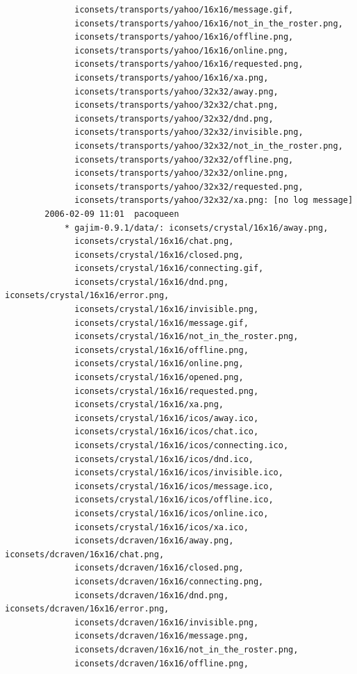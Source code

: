 \documentclass[a4paper]{article}
\begin{document}
\begin{verbatim}
              iconsets/transports/yahoo/16x16/message.gif,
              iconsets/transports/yahoo/16x16/not_in_the_roster.png,
              iconsets/transports/yahoo/16x16/offline.png,
              iconsets/transports/yahoo/16x16/online.png,
              iconsets/transports/yahoo/16x16/requested.png,
              iconsets/transports/yahoo/16x16/xa.png,
              iconsets/transports/yahoo/32x32/away.png,
              iconsets/transports/yahoo/32x32/chat.png,
              iconsets/transports/yahoo/32x32/dnd.png,
              iconsets/transports/yahoo/32x32/invisible.png,
              iconsets/transports/yahoo/32x32/not_in_the_roster.png,
              iconsets/transports/yahoo/32x32/offline.png,
              iconsets/transports/yahoo/32x32/online.png,
              iconsets/transports/yahoo/32x32/requested.png,
              iconsets/transports/yahoo/32x32/xa.png: [no log message]
        2006-02-09 11:01  pacoqueen
            * gajim-0.9.1/data/: iconsets/crystal/16x16/away.png,
              iconsets/crystal/16x16/chat.png,
              iconsets/crystal/16x16/closed.png,
              iconsets/crystal/16x16/connecting.gif,
              iconsets/crystal/16x16/dnd.png, iconsets/crystal/16x16/error.png,
              iconsets/crystal/16x16/invisible.png,
              iconsets/crystal/16x16/message.gif,
              iconsets/crystal/16x16/not_in_the_roster.png,
              iconsets/crystal/16x16/offline.png,
              iconsets/crystal/16x16/online.png,
              iconsets/crystal/16x16/opened.png,
              iconsets/crystal/16x16/requested.png,
              iconsets/crystal/16x16/xa.png,
              iconsets/crystal/16x16/icos/away.ico,
              iconsets/crystal/16x16/icos/chat.ico,
              iconsets/crystal/16x16/icos/connecting.ico,
              iconsets/crystal/16x16/icos/dnd.ico,
              iconsets/crystal/16x16/icos/invisible.ico,
              iconsets/crystal/16x16/icos/message.ico,
              iconsets/crystal/16x16/icos/offline.ico,
              iconsets/crystal/16x16/icos/online.ico,
              iconsets/crystal/16x16/icos/xa.ico,
              iconsets/dcraven/16x16/away.png, iconsets/dcraven/16x16/chat.png,
              iconsets/dcraven/16x16/closed.png,
              iconsets/dcraven/16x16/connecting.png,
              iconsets/dcraven/16x16/dnd.png, iconsets/dcraven/16x16/error.png,
              iconsets/dcraven/16x16/invisible.png,
              iconsets/dcraven/16x16/message.png,
              iconsets/dcraven/16x16/not_in_the_roster.png,
              iconsets/dcraven/16x16/offline.png,

\end{verbatim}
\end{document}
